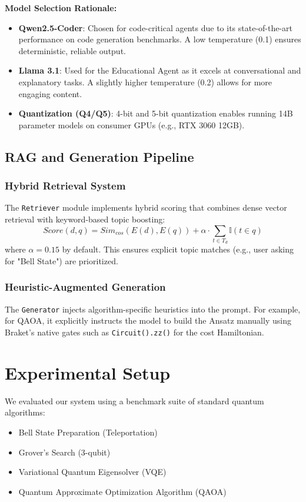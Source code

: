 \documentclass[runningheads]{llncs}
\begin{document}
\textbf{Model Selection Rationale:}
\begin{itemize}
    \item \textbf{Qwen2.5-Coder}: Chosen for code-critical agents due to its state-of-the-art performance on code generation benchmarks. A low temperature (0.1) ensures deterministic, reliable output.
    \item \textbf{Llama 3.1}: Used for the Educational Agent as it excels at conversational and explanatory tasks. A slightly higher temperature (0.2) allows for more engaging content.
    \item \textbf{Quantization (Q4/Q5)}: 4-bit and 5-bit quantization enables running 14B parameter models on consumer GPUs (e.g., RTX 3060 12GB).
\end{itemize}

\subsection{RAG and Generation Pipeline}
\subsubsection{Hybrid Retrieval System}
The \texttt{Retriever} module implements hybrid scoring that combines dense vector retrieval with keyword-based topic boosting:
\begin{equation}
Score(d, q) = Sim_{cos}(E(d), E(q)) + \alpha \cdot \sum_{t \in T_d} \mathbb{I}(t \in q)
\end{equation}
where $\alpha = 0.15$ by default. This ensures explicit topic matches (e.g., user asking for "Bell State") are prioritized.

\subsubsection{Heuristic-Augmented Generation}
The \texttt{Generator} injects algorithm-specific heuristics into the prompt. For example, for QAOA, it explicitly instructs the model to build the Ansatz manually using Braket's native gates such as \texttt{Circuit().zz()} for the cost Hamiltonian.

\section{Experimental Setup}

We evaluated our system using a benchmark suite of standard quantum algorithms:
\begin{itemize}
    \item Bell State Preparation (Teleportation)
    \item Grover's Search (3-qubit)
    \item Variational Quantum Eigensolver (VQE)
    \item Quantum Approximate Optimization Algorithm (QAOA)
\end{itemize}
\end{document}
